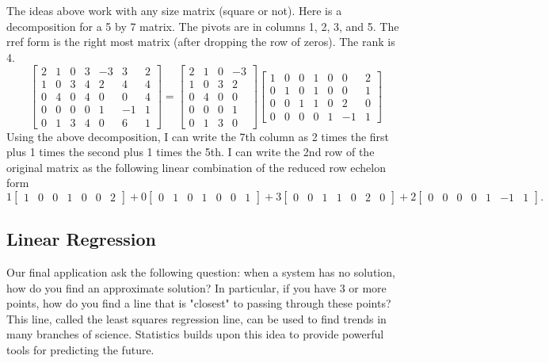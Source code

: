\documentclass[10pt]{article}
\begin{document}
The ideas above work with any size matrix (square or not). Here is a decomposition for a 5 by 7 matrix.  The pivots are in columns 1, 2, 3, and  5. The rref form is the right most matrix (after dropping the row of zeros). The rank is 4. 
$$ \begin{bmatrix} 2&1&0&3&-3&3&2\\1&0&3&4&2&4&4\\0&4&0&4&0&0&4\\0&0&0&0&1&-1&1\\0&1&3&4&0&6&1\end{bmatrix} 
 =  \begin{bmatrix} 2&1&0&-3\\1&0&3&2\\0&4&0&0\\0&0&0&1\\0&1&3&0\end{bmatrix} 
 \begin{bmatrix} 1&0&0&1&0&0&2\\0&1&0&1&0&0&1\\0&0&1&1&0&2&0\\0&0&0&0&1&-1&1\end{bmatrix}
$$
Using the above decomposition, I can write the 7th column as 2 times the first plus 1 times the second plus 1 times the 5th.  I can write the 2nd row of the original matrix as the following linear combination of the reduced row echelon form
$$
1 \begin{bmatrix} 1&0&0&1&0&0&2\end{bmatrix} 
+0 \begin{bmatrix} 0&1&0&1&0&0&1\end{bmatrix}
+3 \begin{bmatrix} 0&0&1&1&0&2&0\end{bmatrix}
+2 \begin{bmatrix} 0&0&0&0&1&-1&1\end{bmatrix}.
$$


\subsection{Linear Regression}

Our final application ask the following question: when a system has no solution, how do you find an approximate solution? In particular, if you have 3 or more points, how do you find a line that is "closest" to passing through these points?  This line, called the least squares regression line, can be used to find trends in many branches of science.  Statistics builds upon this idea to provide powerful tools for predicting the future.
\end{document}
